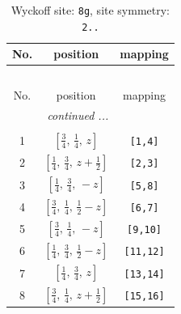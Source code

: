 \documentclass[fleqn,8pt]{jsarticle}
\begin{document}
\begin{longtable}{ccc}
\caption{Wyckoff site: {\tt 8g}, site symmetry: {\tt 2..}}
 \\
 \hline \hline
No. & position & mapping \\ \hline \endfirsthead

\multicolumn{2}{l}{\tablename\ \thetable{}} \\
 \hline \hline
No. & position & mapping \\ \hline \endhead

 \hline \hline
\multicolumn{2}{r}{\footnotesize\it continued ...} \\ \endfoot

 \hline \hline
\multicolumn{2}{r}{} \\ \endlastfoot

1 & $\left[ \frac{3}{4},\, \frac{1}{4},\, z \right]$ & {\tt [1,4]} \\ \hline
2 & $\left[ \frac{1}{4},\, \frac{3}{4},\, z + \frac{1}{2} \right]$ & {\tt [2,3]} \\ \hline
3 & $\left[ \frac{1}{4},\, \frac{3}{4},\, - z \right]$ & {\tt [5,8]} \\ \hline
4 & $\left[ \frac{3}{4},\, \frac{1}{4},\, \frac{1}{2} - z \right]$ & {\tt [6,7]} \\ \hline
5 & $\left[ \frac{3}{4},\, \frac{1}{4},\, - z \right]$ & {\tt [9,10]} \\ \hline
6 & $\left[ \frac{1}{4},\, \frac{3}{4},\, \frac{1}{2} - z \right]$ & {\tt [11,12]} \\ \hline
7 & $\left[ \frac{1}{4},\, \frac{3}{4},\, z \right]$ & {\tt [13,14]} \\ \hline
8 & $\left[ \frac{3}{4},\, \frac{1}{4},\, z + \frac{1}{2} \right]$ & {\tt [15,16]} \\
\end{longtable}
\renewcommand{\arraystretch}{1.2}
\end{document}
